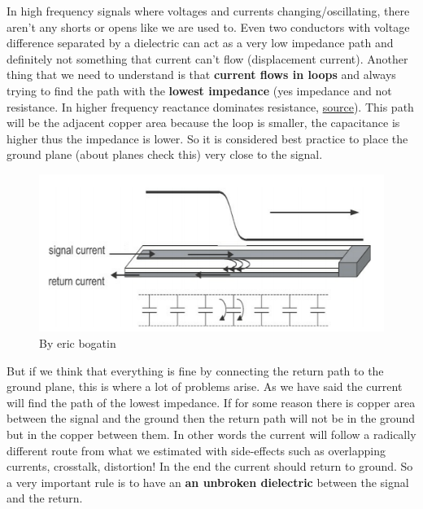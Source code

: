 \documentclass[final]{cubedoc}
\begin{document}
	
	In high frequency signals where voltages and currents changing/oscillating, there aren't any shorts or opens like we are used to. Even two conductors with voltage difference separated by a dielectric can act as a very low impedance path and definitely not something that current can't flow (displacement current). Another thing that we need to understand is that \textbf{current flows in loops} and always trying to find the path with the \textbf{lowest impedance} (yes impedance and not resistance. In higher frequency reactance dominates resistance, \href{https://learnemc.com/pcb-layout}{source}). This path will be the adjacent copper area because the loop is smaller, the capacitance is higher thus the impedance is lower. So it is considered best practice to place the ground plane (about planes check this) very close to the signal.
	
	\begin{figure}[h!]
		\centering
		\includegraphics[keepaspectratio, width=\textwidth, height=.2\textheight]{assets/signal_return.png}
		\caption{By eric bogatin}
	\end{figure}
	
	But if we think that everything is fine by connecting the return path to the ground plane, this is where a lot of problems arise. As we have said the current will find the path of the lowest impedance. If for some reason there is copper area between the signal and the ground then the return path will not be in the ground but in the copper between them. In other words the current will follow a radically different route from what we estimated with side-effects such as overlapping currents, crosstalk, distortion! In the end the current should return to ground. So a very important rule is to have an \textbf{an unbroken dielectric} between the signal and the return. 
	
\end{document}
